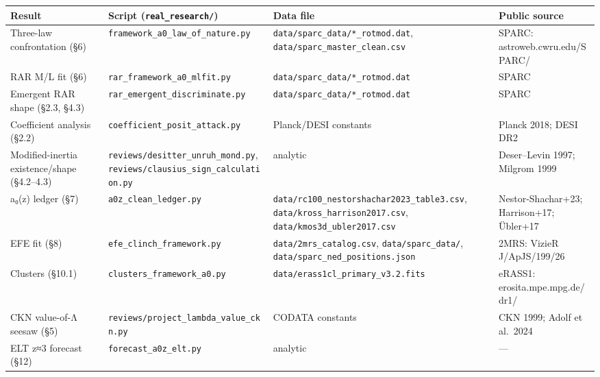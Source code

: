\documentclass[
]{article}
\newcounter{none} %
\begin{document}
{\def\LTcaptype{none} %
\begin{longtable}[]{@{}
  >{\raggedright\arraybackslash}p{}
  >{\raggedright\arraybackslash}p{}
  >{\raggedright\arraybackslash}p{}
  >{\raggedright\arraybackslash}p{}@{}}
\toprule\noalign{}
\begin{minipage}[b]{\linewidth}\raggedright
Result
\end{minipage} & \begin{minipage}[b]{\linewidth}\raggedright
Script (\texttt{real\_research/})
\end{minipage} & \begin{minipage}[b]{\linewidth}\raggedright
Data file
\end{minipage} & \begin{minipage}[b]{\linewidth}\raggedright
Public source
\end{minipage} \\
\midrule\noalign{}
\endhead
\bottomrule\noalign{}
\endlastfoot
Three-law confrontation (§6) &
\texttt{framework\_a0\_law\_of\_nature.py} &
\texttt{data/sparc\_data/*\_rotmod.dat},
\texttt{data/sparc\_master\_clean.csv} & SPARC:
astroweb.cwru.edu/SPARC/ \\
RAR M/L fit (§6) & \texttt{rar\_framework\_a0\_mlfit.py} &
\texttt{data/sparc\_data/*\_rotmod.dat} & SPARC \\
Emergent RAR shape (§2.3, §4.3) &
\texttt{rar\_emergent\_discriminate.py} &
\texttt{data/sparc\_data/*\_rotmod.dat} & SPARC \\
Coefficient analysis (§2.2) & \texttt{coefficient\_posit\_attack.py} &
Planck/DESI constants & Planck 2018; DESI DR2 \\
Modified-inertia existence/shape (§4.2--4.3) &
\texttt{reviews/desitter\_unruh\_mond.py},
\texttt{reviews/clausius\_sign\_calculation.py} & analytic &
Deser--Levin 1997; Milgrom 1999 \\
a₀(z) ledger (§7) & \texttt{a0z\_clean\_ledger.py} &
\texttt{data/rc100\_nestorshachar2023\_table3.csv},
\texttt{data/kross\_harrison2017.csv},
\texttt{data/kmos3d\_ubler2017.csv} & Nestor-Shachar+23; Harrison+17;
Übler+17 \\
EFE fit (§8) & \texttt{efe\_clinch\_framework.py} &
\texttt{data/2mrs\_catalog.csv}, \texttt{data/sparc\_data/},
\texttt{data/sparc\_ned\_positions.json} & 2MRS: VizieR J/ApJS/199/26 \\
Clusters (§10.1) & \texttt{clusters\_framework\_a0.py} &
\texttt{data/erass1cl\_primary\_v3.2.fits} & eRASS1:
erosita.mpe.mpg.de/dr1/ \\
CKN value-of-Λ seesaw (§5) &
\texttt{reviews/project\_lambda\_value\_ckn.py} & CODATA constants & CKN
1999; Adolf et al.~2024 \\
ELT z≈3 forecast (§12) & \texttt{forecast\_a0z\_elt.py} & analytic &
--- \\
\end{longtable}
}
\end{document}
